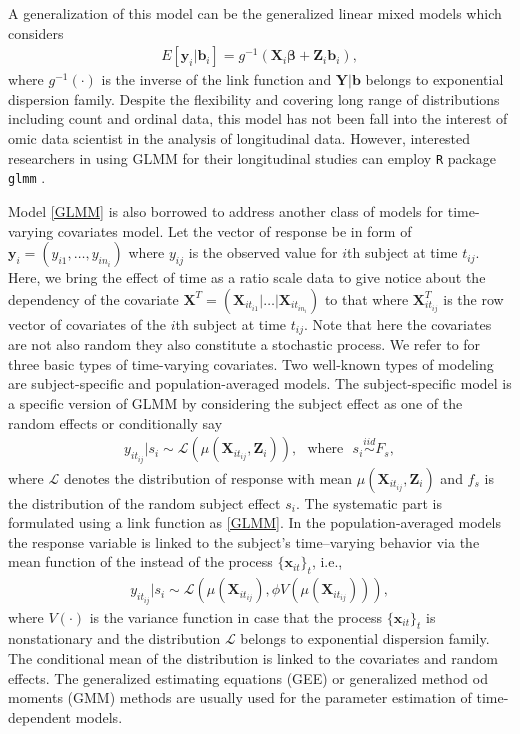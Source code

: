 \documentclass[]{article}
\begin{document}
	A generalization of this model can be the generalized linear mixed models \citep{Breslow1993} which considers 
	\begin{eqnarray}\label{GLMM}
		E[\mathbf{y}_i|\mathbf{b}_i]=g^{-1}(\mathbf{X}_i\boldsymbol{\beta}+\mathbf{Z}_i\mathbf{b}_i),
	\end{eqnarray}
	where $g^{-1}(\cdot)$ is the inverse of the link function and $\mathbf{Y}|\mathbf{b}$ belongs to exponential dispersion family. Despite the flexibility and covering long range of distributions including count and ordinal data, this model has not been fall into the interest of omic data scientist in the analysis of longitudinal data. However, interested researchers in using GLMM for their longitudinal studies can employ \texttt{R} package \texttt{glmm} \citep{Knudson2021}. 
	
	Model \eqref{GLMM} is also borrowed to address another class of models for time-varying covariates model. Let the vector of response be in form of $\mathbf{y}_i=(y_{i1},\ldots,y_{in_i})$ where $y_{ij}$ is the observed value for $i$th subject at time $t_{ij}$. Here, we bring the effect of time as a ratio scale data to give notice about the dependency of the covariate $\mathbf{X}^T=(\mathbf{X}_{it_{i1}}|\ldots|\mathbf{X}_{it_{in_i}})$ to that where $\mathbf{X}_{it_{ij}}^T$ is the row vector of covariates of the $i$th subject at time $t_{ij}$. Note that here the covariates are not also random they also constitute a stochastic process. We refer to \cite{LaiSmall2007} for three basic types of time-varying covariates. Two well-known types of modeling are subject-specific and population-averaged models. The subject-specific model is a specific version of GLMM by considering the subject effect as one of the random effects or conditionally say
	\begin{eqnarray*}
		y_{it_{ij}}|s_i\sim\mathcal{L}(\mu(\mathbf{X}_{it_{ij}},\mathbf{Z}_i)),~~~\mathrm{where}~~~
		s_i\overset{iid}{\sim}F_s,
	\end{eqnarray*}
	where $\mathcal{L}$ denotes the distribution of response with mean $\mu(\mathbf{X}_{it_{ij}},\mathbf{Z}_i)$ and $f_s$ is the distribution of the random subject effect $s_i$. The systematic part is formulated using a link function as \eqref{GLMM}. In the population-averaged models the response variable is linked to the subject's time--varying behavior via the mean function of the instead of the process $\{\mathbf{x}_{it}\}_t$, i.e., 
	\begin{eqnarray*}
		y_{it_{ij}}|s_i\sim\mathcal{L}(\mu(\mathbf{X}_{it_{ij}}), \phi V(\mu(\mathbf{X}_{it_{ij}}))),
	\end{eqnarray*} 
	where $V(\cdot)$ is the variance function in case that the process $\{\mathbf{x}_{it}\}_t$ is nonstationary and the distribution $\mathcal{L}$ belongs to exponential dispersion family. The conditional mean of the distribution is linked to the covariates and random effects. The generalized estimating equations (GEE) or generalized method od moments (GMM) methods are usually used for the parameter estimation of time-dependent models. 
	
\end{document}
